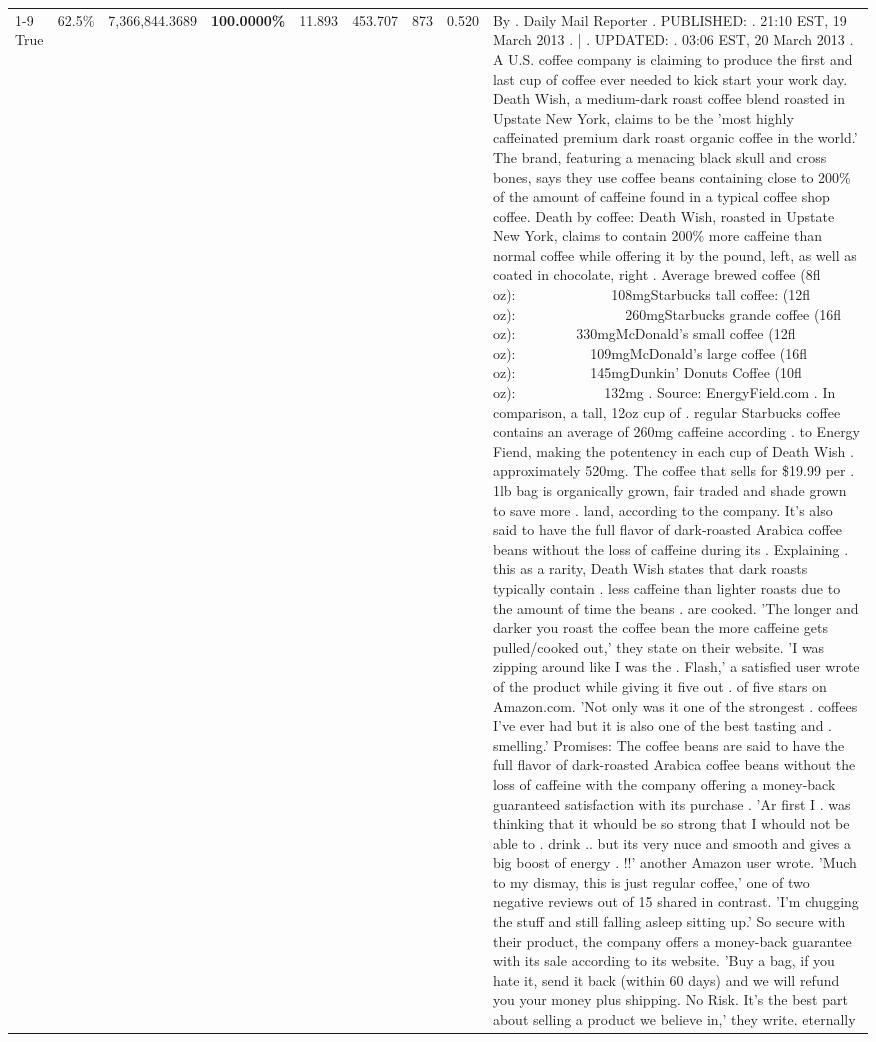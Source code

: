 \begin{table}[H]
{\begin{tabular}{lllrlllll}
\cline{1-9}
True & 62.5\% & 7,366,844.3689 & \bfseries \color{red} 100.0000\% & 11.893 & 453.707 & 873 & 0.520 & By . Daily Mail Reporter . PUBLISHED: . 21:10 EST, 19 March 2013 . | . UPDATED: . 03:06 EST, 20 March 2013 . A U.S. coffee company is claiming to produce the first and last cup of coffee ever needed to kick start your work day. Death Wish, a medium-dark roast coffee blend roasted in Upstate New York, claims to be the 'most highly caffeinated premium dark roast organic coffee in the world.' The brand, featuring a menacing black skull and cross bones, says they use coffee beans containing close to 200\% of the amount of caffeine found in a typical coffee shop coffee. Death by coffee: Death Wish, roasted in Upstate New York, claims to contain 200\% more caffeine than normal coffee while offering it by the pound, left, as well as coated in chocolate, right . Average brewed coffee (8fl oz):              108mgStarbucks tall coffee: (12fl oz):                260mgStarbucks grande coffee (16fl oz):         330mgMcDonald's small coffee (12fl oz):           109mgMcDonald's large coffee (16fl oz):           145mgDunkin' Donuts Coffee (10fl oz):             132mg . Source: EnergyField.com . In comparison, a tall, 12oz cup of . regular Starbucks coffee contains an average of 260mg caffeine according . to Energy Fiend, making the potentency in each cup of Death Wish . approximately 520mg. The coffee that sells for \$19.99 per . 1lb bag is organically grown, fair traded and shade grown to save more . land, according to the company. It's also said to have the full flavor of dark-roasted Arabica coffee beans without the loss of caffeine during its . Explaining . this as a rarity, Death Wish states that dark roasts typically contain . less caffeine than lighter roasts due to the amount of time the beans . are cooked. 'The longer and darker you roast the coffee bean the more caffeine gets pulled/cooked out,' they state on their website. 'I was zipping around like I was the . Flash,' a satisfied user wrote of the product while giving it five out . of five stars on Amazon.com. 'Not only was it one of the strongest . coffees I've ever had but it is also one of the best tasting and . smelling.’ Promises: The coffee beans are said to have the full flavor of dark-roasted Arabica coffee beans without the loss of caffeine with the company offering a money-back guaranteed satisfaction with its purchase . 'Ar first I . was thinking that it whould be so strong that I whould not be able to . drink .. but its very nuce and smooth and gives a big boost of energy . !!' another Amazon user wrote. 'Much to my dismay, this is just regular coffee,' one of two negative reviews out of 15 shared in contrast. 'I'm chugging the stuff and still falling asleep sitting up.' So secure with their product, the company offers a money-back guarantee with its sale according to its website. 'Buy a bag, if you hate it, send it back (within 60 days) and we will refund you your money plus shipping. No Risk. It’s the best part about selling a product we believe in,' they write. eternally \\

\end{tabular}}
\end{table}
